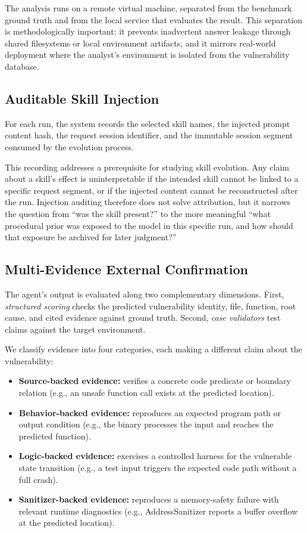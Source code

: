 ﻿\documentclass[preprint,12pt]{elsarticle}
\begin{document}
The analysis runs on a remote virtual machine, separated from the
benchmark ground truth and from the local service that evaluates the
result.  This separation is methodologically important: it prevents
inadvertent answer leakage through shared filesystems or local environment
artifacts, and it mirrors real-world deployment where the analyst's
environment is isolated from the vulnerability database.

\subsection{Auditable Skill Injection}
\label{sec:injection}

For each run, the system records the selected skill names, the injected
prompt content hash, the request session identifier, and the immutable
session segment consumed by the evolution process.

This recording addresses a prerequisite for studying skill evolution.
Any claim about a skill's effect is uninterpretable if the intended skill
cannot be linked to a specific request segment, or if the injected content
cannot be reconstructed after the run.  Injection auditing therefore does
not solve attribution, but it narrows the question from ``was the skill
present?'' to the more meaningful ``what procedural prior was exposed to
the model in this specific run, and how should that exposure be archived
for later judgment?''

\subsection{Multi-Evidence External Confirmation}
\label{sec:confirmation}

The agent's output is evaluated along two complementary dimensions.  First,
\emph{structured scoring} checks the predicted vulnerability identity,
file, function, root cause, and cited evidence against ground truth.
Second, \emph{case validators} test claims against the target environment.

We classify evidence into four categories, each making a different claim
about the vulnerability:

\begin{itemize}[leftmargin=*]
    \item \textbf{Source-backed evidence:} verifies a concrete code
    predicate or boundary relation (e.g., an unsafe function call exists
    at the predicted location).
    \item \textbf{Behavior-backed evidence:} reproduces an expected program
    path or output condition (e.g., the binary processes the input and
    reaches the predicted function).
    \item \textbf{Logic-backed evidence:} exercises a controlled harness
    for the vulnerable state transition (e.g., a test input triggers the
    expected code path without a full crash).
    \item \textbf{Sanitizer-backed evidence:} reproduces a memory-safety
    failure with relevant runtime diagnostics (e.g., AddressSanitizer
    reports a buffer overflow at the predicted location).
\end{itemize}
\end{document}
